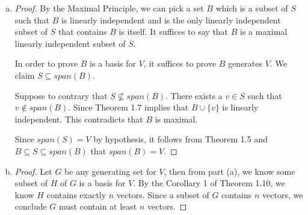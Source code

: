 \begin{Exercise}
\begin{enumerate}[(a)]
\item
\begin{proof}
By the Maximal Principle, we can pick a set $B$ which is a subset of $S$ such that $B$ is linearly independent and is the only linearly independent subset of $S$ that contains $B$ is itself. It suffices to say that $B$ is a maximal linearly independent subset of $S$.

In order to prove $B$ is a basis for $V$, it suffices to prove $B$ generates $V$. We claim $S\subseteq span(B)$.

Suppose to contrary that $S\nsubseteq span(B)$. There exists a $v\in S$ such that $v\notin span(B)$. Since Theorem 1.7 implies that $B\cup \{v\}$ is linearly independent. This contradicts that $B$ is maximal.

Since $span(S) = V$ by hypothesis, it follows from Theorem 1.5 and $B\subseteq S\subseteq span(B)$ that $span(B) = V$.
\end{proof}

\item
\begin{proof}
Let $G$ be any generating set for $V$, then from part (a), we know some subset of $H$ of $G$ is a basis for $V$. By the Corollary 1 of Theorem 1.10, we know $H$ contains exactly $n$ vectors. Since a subset of $G$ contains $n$ vectors, we conclude $G$ must contain at least $n$ vectors. 
\end{proof}
\end{enumerate}
\end{Exercise}